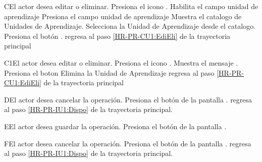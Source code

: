 \begin{UCtrayectoriaA}{C}{El actor desea editar o eliminar.}
	\UCpaso [\UCactor] Presiona el icono \IURegistrar. 
	\UCpaso [\UCsist] Habilita el campo unidad de aprendizaje
	\UCpaso [\UCactor] Presiona el campo unidad de aprendizaje 
	\UCpaso [\UCsist] Muestra el catalogo de Unidades de Aprendizaje. 
	\UCpaso [\UCactor] Selecciona la Unidad de Aprendizaje desde el catalogo.
	\UCpaso [\UCactor] Presiona el botón . 
	\UCpaso [\UCsist] regresa al paso \ref{HR-PR-CU1:EdiEli} de la trayectoria principal
\end{UCtrayectoriaA} 

\begin{UCtrayectoriaA}{C1}{El actor desea editar o eliminar.}
	\UCpaso [\UCactor] Presiona el icono \IUEliminar.
	\UCpaso [\UCsist] Muestra el mensaje .
	\UCpaso [\UCactor] Presiona el boton 
	\UCpaso [\UCsist] Elimina la Unidad de Aprendizaje
	\UCpaso [\UCsist] regresa al paso \ref{HR-PR-CU1:EdiEli} de la trayectoria principal
\end{UCtrayectoriaA} 


\begin{UCtrayectoriaA}{D}{El actor desea cancelar la operación.}
	\UCpaso [\UCactor] Presiona el botón  de la pantalla .
	\UCpaso regresa al paso \ref{HR-PR-IU1:Dispo} de la trayectoria principal.
\end{UCtrayectoriaA}

\begin{UCtrayectoriaA}{E}{El actor desea guardar la operación.}
	\UCpaso [\UCactor] Presiona el botón  de la pantalla .
\end{UCtrayectoriaA} 

\begin{UCtrayectoriaA}{F}{El actor desea cancelar la operación.}
	\UCpaso [\UCactor] Presiona el botón  de la pantalla .
	\UCpaso regresa al paso \ref{HR-PR-IU1:Dispo} de la trayectoria principal.
\end{UCtrayectoriaA}




